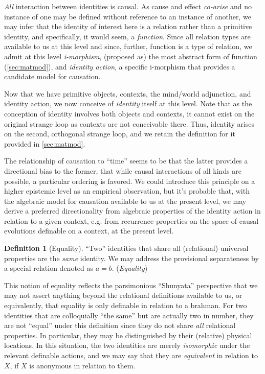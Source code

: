 \documentclass[pra,twocolumn,groupedaddress,10pt]{revtex4}
\theoremstyle{definition}
\newtheorem{defn}{Definition}[section]
\begin{document}
\begin{enumerate}[label={[\textbf{\arabic*}]},start=0]
		\emph{All} interaction between identities is causal. As cause and effect \emph{co-arise} and no instance of one may be defined without reference to an instance of another, we may infer that the identity of interest here is a relation rather than a primitive identity, and specifically, it would seem, a \emph{function}. Since all relation types are available to us at this level and since, further, function is a type of relation, we admit at this level \emph{i-morphism}, (proposed as) the most abstract form of function (\autoref{sec:matmod}), and \emph{identity action}, a specific i-morphism that provides a candidate model for causation.

		Now that we have primitive objects, contexts, the mind/world adjunction, and identity action, we now conceive of \emph{identity} itself at this level. Note that as the conception of identity involves both objects and contexts, it cannot exist on the original strange loop as contexts are not conceivable there. Thus, identity arises on the second, orthogonal strange loop, and we retain the definition for it provided in \autoref{sec:matmod}.

		The relationship of causation to ``time'' seems to be that the latter provides a directional bias to the former, that while causal interactions of all kinds are possible, a particular ordering is favored. We could introduce this principle on a higher epistemic level as an empirical observation, but it's probable that, with the algebraic model for causation available to us at the present level, we may derive a preferred directionality from algebraic properties of the identity action in relation to a given context, e.g. from recurrence properties on the space of causal evolutions definable on a context, at the present level.

		\begin{defn}[Equality]
			``Two'' identities that share all (relational) universal properties are the \emph{same} identity. We may address the provisional separateness by a special relation denoted as $a = b$. (\emph{Equality})
		\end{defn}

		This notion of equality reflects the parsimonious ``Shunyata'' perspective that we may not assert anything beyond the relational definitions available to us, or equivalently, that equality is only definable in relation to a brahman. For two identities that are colloquially ``the same'' but are actually two in number, they are not ``equal'' under this definition since they do not share \emph{all} relational properties. In particular, they may be distinguished by their (relative) physical locations. In this situation, the two identities are merely \emph{isomorphic} under the relevant definable actions, and we may say that they are \emph{equivalent} in relation to $X$, if $X$ is anonymous in relation to them.


\end{enumerate}
\end{document}
